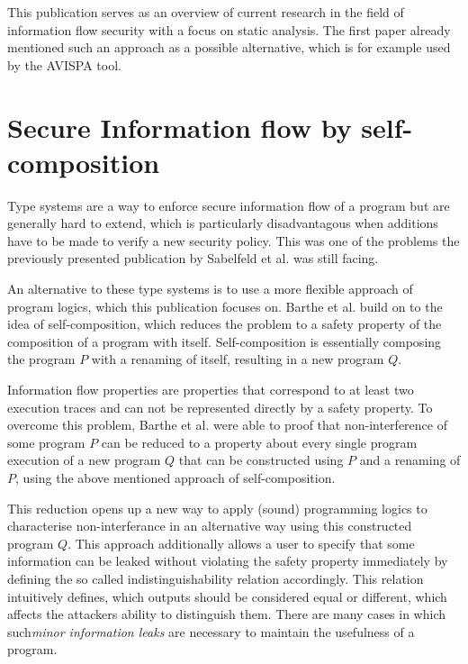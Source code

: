 \documentclass[a4paper,UKenglish]{lipics-v2018}
\begin{document}
This publication serves as an overview of current research in the field of information flow security with a focus on static analysis. The first paper already mentioned such an approach as a possible alternative, which is for example used by the AVISPA tool.\cite{model_checking_security_protocols} 






\newpage
\section{Secure Information flow by self-composition}

Type systems are a way to enforce secure information flow of a program but are generally hard to extend, which is particularly disadvantagous when additions have to be made to verify a new security policy. This was one of the problems the previously presented publication by Sabelfeld et al. was still facing.\cite{language_based_information_flow_security} 

An alternative to these type systems is to use a more flexible approach of program logics, which this publication focuses on. Barthe et al. build on to the idea of self-composition, which reduces the problem to a safety property of the composition of a program with itself. Self-composition is essentially composing the program $P$ with a renaming of itself, resulting in a new program $Q$.
\cite{information_flow_by_self_composition}

Information flow properties are properties that correspond to at least two execution traces and can not be represented directly by a safety property. To overcome this problem, Barthe et al. were able to proof that non-interference of some program $P$ can be reduced to a property about every single program execution of a new program $Q$ that can be constructed using $P$ and a renaming of $P$, using the above mentioned approach of self-composition.\cite{information_flow_by_self_composition}

This reduction opens up a new way to apply (sound) programming logics to characterise non-interferance in an alternative way using this constructed program $Q$. This approach additionally allows a user to specify that some information can be leaked without violating the safety property immediately by defining the so called indistinguishability relation accordingly. This relation intuitively defines, which outputs should be considered equal or different, which affects the attackers ability to distinguish them. There are many cases in which such\textit{minor information leaks} are necessary to maintain the usefulness of a program.\cite{information_flow_by_self_composition}
\end{document}
